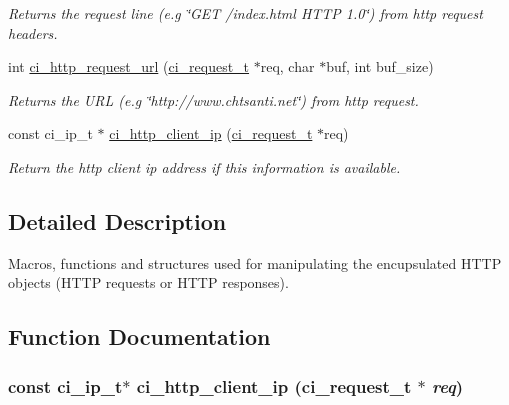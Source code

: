 \begin{DoxyCompactItemize}
\begin{DoxyCompactList}\small\item\em Returns the request line (e.g \char`\"{}GET /index.html HTTP 1.0\char`\"{}) from http request headers. \item\end{DoxyCompactList}\item 
int \hyperlink{group__HTTP_gac1081e7bbfaa5ac736621a0a17cd703c}{ci\_\-http\_\-request\_\-url} (\hyperlink{group__REQUEST_ga27da5c4ae491f527ce36901c2e78ea04}{ci\_\-request\_\-t} $\ast$req, char $\ast$buf, int buf\_\-size)
\begin{DoxyCompactList}\small\item\em Returns the URL (e.g \char`\"{}http://www.chtsanti.net\char`\"{}) from http request. \item\end{DoxyCompactList}\item 
const ci\_\-ip\_\-t $\ast$ \hyperlink{group__HTTP_ga12509ca0255deacf0f8446bdd2f42495}{ci\_\-http\_\-client\_\-ip} (\hyperlink{group__REQUEST_ga27da5c4ae491f527ce36901c2e78ea04}{ci\_\-request\_\-t} $\ast$req)
\begin{DoxyCompactList}\small\item\em Return the http client ip address if this information is available. \item\end{DoxyCompactList}\end{DoxyCompactItemize}


\subsection{Detailed Description}
Macros, functions and structures used for manipulating the encupsulated HTTP objects (HTTP requests or HTTP responses). 

\subsection{Function Documentation}
\hypertarget{group__HTTP_ga12509ca0255deacf0f8446bdd2f42495}{
\subsubsection[{ci\_\-http\_\-client\_\-ip}]{\setlength{\rightskip}{0pt plus 5cm}const ci\_\-ip\_\-t$\ast$ ci\_\-http\_\-client\_\-ip ({\bf ci\_\-request\_\-t} $\ast$ {\em req})}}
\label{group__HTTP_ga12509ca0255deacf0f8446bdd2f42495}


